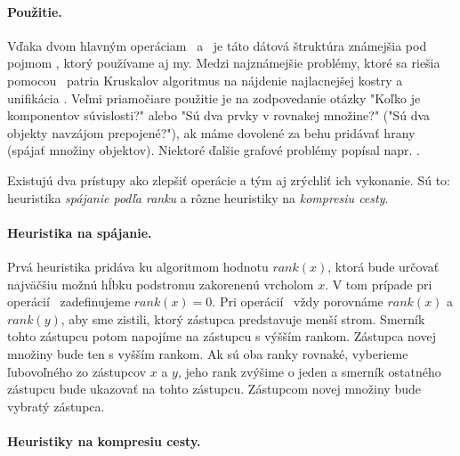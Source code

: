 \paragraph{Použitie.}
Vďaka dvom hlavným operáciam \find\ a \union\ 
je táto dátová štruktúra známejšia pod pojmom \emph{\uf}, ktorý 
používame aj my. Medzi najznámejšie problémy, ktoré sa riešia pomocou 
\uf\ patria Kruskalov algoritmus na nájdenie najlacnejšej kostry 
\citep{kruskal} a unifikácia \citep{unif}. Veľmi priamočiare použitie je 
na zodpovedanie otázky "Koľko je komponentov súvislosti?" alebo
"Sú dva prvky v rovnakej množine?" ("Sú dva objekty navzájom prepojené?"), 
ak máme dovolené za behu pridávať hrany (spájať množiny objektov). 
Niektoré ďalšie grafové problémy popísal napr. \citet{paths1}.

\bigskip
Existujú dva prístupy ako zlepšiť operácie a tým aj zrýchliť ich vykonanie. 
Sú to: heuristika \emph{spájanie podľa ranku} a rôzne heuristiky na 
\emph{kompresiu cesty}. 

\paragraph{Heuristika na spájanie.}
Prvá heuristika pridáva ku algoritmom hodnotu 
$rank(x)$, ktorá bude určovať najväčšiu možnú hĺbku podstromu zakorenenú 
vrcholom $x$. V tom prípade pri o\-pe\-rá\-cií \makeset\ zadefinujeme 
$rank(x) = 0$. 
Pri o\-pe\-rá\-cií \union\ vždy porovnáme $rank(x)$ a $rank(y)$, aby sme zistili, 
ktorý zástupca predstavuje menší strom. Smerník tohto zástupcu potom napojíme 
na zástupcu s výšším rankom. Zástupca novej množiny bude ten s vyšším rankom. 
Ak sú oba ranky rovnaké, vyberieme ľubovoľného zo zástupcov $x$ a $y$, 
jeho rank zvýšime o jeden a smerník ostatného zástupcu bude ukazovať 
na tohto zástupcu. Zástupcom novej množiny bude vybratý zástupca. 

\paragraph{Heuristiky na kompresiu cesty.}

